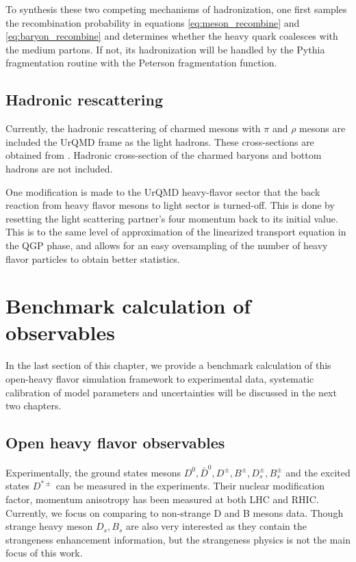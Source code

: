 To synthesis these two competing mechanisms of hadronization, one first samples the recombination probability in equations \ref{eq:meson_recombine} and \ref{eq:baryon_recombine} and determines whether the heavy quark coalesces with the medium partons. 
If not, its hadronization will be handled by the Pythia fragmentation routine with the Peterson fragmentation function.

\subsection{Hadronic rescattering}
Currently, the hadronic rescattering of charmed mesons with $\pi$ and $\rho$ mesons are included the UrQMD frame as the light hadrons. 
These cross-sections are obtained from \cite{Lin:2000jp}.
Hadronic cross-section of the charmed baryons and bottom hadrons are not included.

One modification is made to the UrQMD heavy-flavor sector that the back reaction from heavy flavor mesons to light sector is turned-off. 
This is done by resetting the light scattering partner's four momentum back to its initial value.
This is to the same level of approximation of the linearized transport equation in the QGP phase, and allows for an easy oversampling of the number of heavy flavor particles to obtain better statistics.

\section{Benchmark calculation of observables}
\label{section:benchmark}
In the last section of this chapter, we provide a benchmark calculation of this open-heavy flavor simulation framework to experimental data, systematic calibration of model parameters and uncertainties will be discussed in the next two chapters.

\subsection{Open heavy flavor observables}
Experimentally, the ground states mesons $D^0, \bar{D}^0, D^{\pm}, B^{\pm}, D_s^{\pm}, B_s^{\pm}$ and the excited states $D^{*\pm}$ can be measured in the experiments. 
Their nuclear modification factor, momentum anisotropy has been measured at both LHC and RHIC.
Currently, we focus on comparing to non-strange D and B mesons data.
Though strange heavy meson $D_s, B_s$ are also very interested as they contain the strangeness enhancement information, but the strangeness physics is not the main focus of this work.

